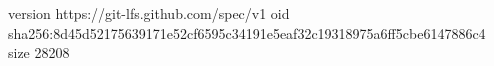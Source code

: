 version https://git-lfs.github.com/spec/v1
oid sha256:8d45d52175639171e52cf6595c34191e5eaf32c19318975a6ff5cbe6147886c4
size 28208
